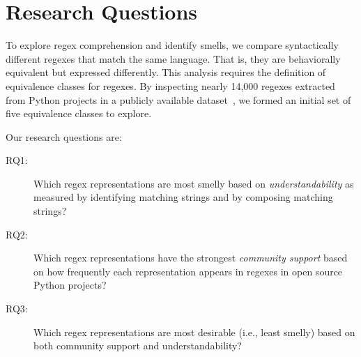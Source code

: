 





\section{Research Questions}
\label{sec:study}

To explore regex comprehension and identify smells, we compare syntactically different regexes that match the same language. That is, they are behaviorally equivalent but expressed differently. This analysis requires the definition of equivalence classes for regexes. By inspecting  nearly 14,000 regexes extracted from Python projects in a publicly available dataset~\cite{chapman2016}, we formed an initial set of five equivalence classes to explore. 

Our  research questions are:

\begin{description}
\item[RQ1:] Which regex representations are most smelly based on \emph{understandability} as measured by identifying matching strings and by composing matching strings?
\item[RQ2:] Which regex representations have the strongest \emph{community support} based on how frequently each representation appears in regexes in open source Python projects?
\item[RQ3:] Which regex representations are most desirable (i.e., least smelly) based on both community support and understandability?
\end{description}

